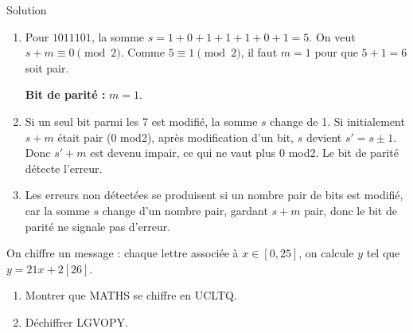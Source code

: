 \documentclass[a4paper,12pt]{article}
\begin{document}
\begin{solutionbox}{Solution}
\begin{enumerate}
    \item Pour $1011101$, la somme $s=1+0+1+1+1+0+1=5$.
    On veut $s+m \equiv 0 \pmod{2}$.  
    Comme $5 \equiv 1 \pmod{2}$, il faut $m=1$ pour que $5+1=6$ soit pair.

    \textbf{Bit de parité :} $m=1$.

    \item Si un seul bit parmi les 7 est modifié, la somme $s$ change de 1.  
    Si initialement $s+m$ était pair (0 mod2), après modification d’un bit, $s$ devient $s' = s \pm 1$.  
    Donc $s' + m$ est devenu impair, ce qui ne vaut plus 0 mod2.  
    Le bit de parité détecte l’erreur.

    \item Les erreurs non détectées se produisent si un nombre pair de bits est modifié, car la somme $s$ change d’un nombre pair, gardant $s+m$ pair, donc le bit de parité ne signale pas d’erreur.
\end{enumerate}
\end{solutionbox}

\begin{exercice}[title=Exercice 30 $\quad \star \star \quad$ { [Calculer, Modéliser]}]{}{}
On chiffre un message : chaque lettre associée à $x \in [0,25]$, on calcule $y$ tel que $y=21x+2[26]$.
\begin{enumerate}
    \item Montrer que MATHS se chiffre en UCLTQ.
    \item Déchiffrer LGVOPY.
\end{enumerate}
\end{exercice}
\end{document}
